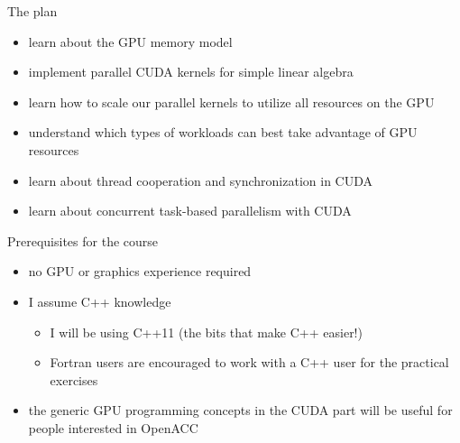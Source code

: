 
\begin{frame}[fragile]{}
    \begin{info}{The plan}
        \begin{itemize}
            \item learn about the GPU memory model
            \item implement parallel CUDA kernels for simple linear algebra
            \item learn how to scale our parallel kernels to utilize all resources on the GPU
            \item understand which types of workloads can best take advantage of GPU resources
            \item learn about thread cooperation and synchronization in CUDA
            \item learn about concurrent task-based parallelism with CUDA
        \end{itemize}
    \end{info}

\end{frame}

\begin{frame}[fragile]{}
    \begin{info}{Prerequisites for the course}
        \begin{itemize}
            \item no GPU or graphics experience required
            \item I assume C++ knowledge
            \begin{itemize}
                \item I will be using C++11 (the bits that make C++ easier!)
                \item Fortran users are encouraged to work with a C++ user for the practical exercises
            \end{itemize}
            \item the generic GPU programming concepts in the CUDA part will be useful for people interested in OpenACC
        \end{itemize}
    \end{info}

\end{frame}

